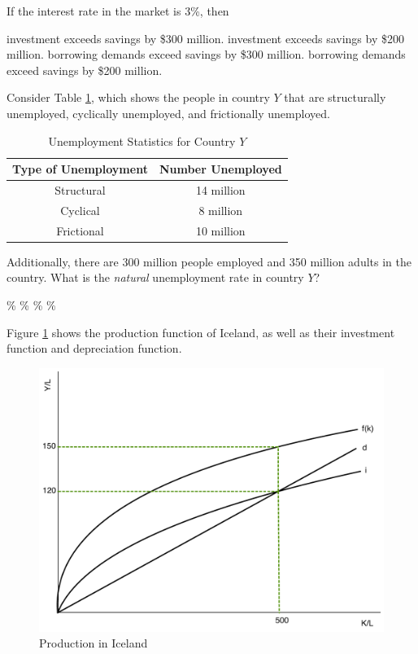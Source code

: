 \documentclass[addpoints,11pt]{exam}
\theoremstyle{definition}
\begin{document}
\begin{questions}
	If the interest rate in the market is 3\%, then 
	
	\begin{choices}
			\choice investment exceeds savings by \$300 million.
			\choice investment exceeds savings by \$200 million.
			\choice borrowing demands exceed savings by \$300 million.
			\CorrectChoice borrowing demands exceed savings by \$200 million.
	\end{choices}
	

	\question Consider Table \ref{MC28}, which shows the people in country $Y$ that are structurally unemployed, cyclically unemployed, and frictionally unemployed. 
	
	
	\begin{table}[H]
		\caption{Unemployment Statistics for Country $Y$}
		\centering
		\begin{tabular}{  c | c} 
			
			Type of Unemployment & Number Unemployed\\
			\hline
			Structural &  14 million\\
			Cyclical &  8 million\\
			Frictional & 10 million\\
		\end{tabular}
		\label{MC28}
	\end{table}
	
	
	Additionally, there are 300 million people employed and 350 million adults in the country. What is the \textit{natural} unemployment rate in country $Y$?
	
\newpage
	
	\begin{choices}
		\CorrectChoice 7.2\%
		\choice 8.0\%
		\choice 9.1\%
		\choice 9.6\%
	\end{choices}
	
	
	\question Figure \ref{MC30} shows the production function of Iceland, as well as their investment function and depreciation function.
	
	
	\begin{figure}[H]
		\centering
		\includegraphics[scale=.4]{Exam2_MC30.pdf}
		\caption{Production in Iceland}
		\label{MC30}
	\end{figure}
	

\end{questions}
\end{document}
